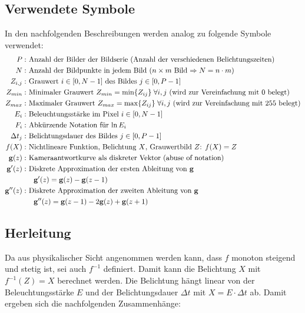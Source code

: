 \subsection{Verwendete Symbole}
In den nachfolgenden Beschreibungen werden analog zu \cite{paper} folgende Symbole verwendet:
\begin{align*}
P: &  \mbox{ Anzahl der Bilder der Bildserie (Anzahl der verschiedenen Belichtungszeiten)}\\
N: & \mbox{ Anzahl der Bildpunkte in jedem Bild ($n \times m$ Bild $\Rightarrow N = n \cdot m$)}\\
Z_{i,j} : &\mbox{ Grauwert $i \in [0, N-1]$ des Bildes $j \in [0, P-1]$}\\
Z_{min} : & \mbox{ Minimaler Grauwert $Z_{min} = \min \{Z_{ij}\} \; \forall i,j$ (wird zur Vereinfachung mit $0$ belegt)}\\
Z_{max} : & \mbox{ Maximaler Grauwert $Z_{max} = \max \{Z_{ij}\} \; \forall i,j$ (wird zur Vereinfachung mit $255$ belegt)}\\
E_i : & \mbox{ Beleuchtungsstärke im Pixel $i \in [0, N-1]$ }\\
F_i : & \mbox{ Abkürzende Notation für $\ln E_i$}\\
\Delta t_j : & \mbox{ Belichtungsdauer des Bildes $j \in [0, P-1]$}\\
f(X) : & \mbox{ Nichtlineare Funktion, Belichtung $X$, Grauwertbild $Z$: $f(X) = Z$}\\
\mathbf g(z) : & \mbox{ Kameraantwortkurve als diskreter Vektor (abuse of notation)}\\
\mathbf{g}'(z) : & \mbox{ Diskrete Approximation der ersten Ableitung von }\mathbf g\\
		& \quad \mathbf g'(z) = \mathbf g(z) - \mathbf g(z-1)\\
\mathbf{g}''(z)  : & \mbox{ Diskrete Approximation der zweiten Ableitung von }\mathbf g\\
		& \quad \mathbf g''(z) = \mathbf g(z-1)-2\mathbf g(z)+\mathbf g(z+1)
\end{align*}

\subsection{Herleitung}
Da aus physikalischer Sicht angenommen werden kann, dass $f$ monoton steigend und stetig ist, sei auch $f^{-1}$ definiert. Damit kann die Belichtung $X$ mit $f^{-1}(Z) = X$ berechnet werden. Die Belichtung hängt linear von der Beleuchtungsstärke $E$ und der Belichtungsdauer $\Delta t$ mit $X = E \cdot \Delta t$ ab. Damit ergeben sich die nachfolgenden Zusammenhänge:


